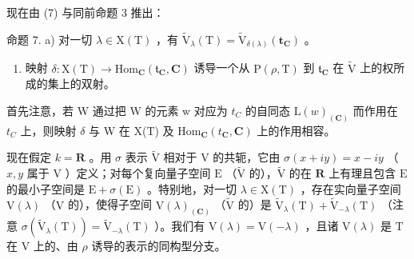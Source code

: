 现在由 (7) 与同前命题 3 推出：

命题 7. a) 对一切 \(\lambda \in \mathrm{X(T)}\) ，有 \(\tilde{\mathrm{V}}_{\lambda}(\mathrm{T}) = \tilde{\mathrm{V}}_{\delta (\lambda)}(\mathbf{t}_{\mathbf{C}})\) 。

\begin{enumerate}
\def\labelenumi{\alph{enumi})}
\setcounter{enumi}{1}
\tightlist
\item
  映射 \(\delta : \mathrm{X(T)} \to \mathrm{Hom}_{\mathbf{C}}(\mathfrak{t}_{\mathbf{C}}, \mathbf{C})\) 诱导一个从 \(\mathrm{P}(\rho, \mathrm{T})\) 到 \(\mathfrak{t}_{\mathbf{C}}\) 在 \(\tilde{\mathrm{V}}\) 上的权所成的集上的双射。
\end{enumerate}

首先注意，若 W 通过把 W 的元素 w 对应为 \(t_{C}\) 的自同态 \(\mathrm{L}(w)_{(\mathbf{C})}\) 而作用在 \(t_{C}\) 上，则映射 \(\delta\) 与 W 在 X(T) 及 \(\mathrm{Hom}_{\mathbf{C}}(t_{\mathbf{C}}, \mathbf{C})\) 上的作用相容。

现在假定 \(k = \mathbf{R}\) 。用 \(\sigma\) 表示 \(\tilde{\mathrm{V}}\) 相对于 \(\mathrm{V}\) 的共轭，它由 \(\sigma(x + iy) = x - iy\) （\(x, y\) 属于 \(\mathrm{V}\) ）定义；对每个复向量子空间 \(\mathrm{E}\) （\(\tilde{\mathrm{V}}\) 的），\(\tilde{\mathrm{V}}\) 的在 \(\mathbf{R}\) 上有理且包含 \(\mathrm{E}\) 的最小子空间是 \(\mathrm{E} + \sigma(\mathrm{E})\) 。特别地，对一切 \(\lambda \in \mathrm{X}(\mathrm{T})\) ，存在实向量子空间 \(\mathrm{V}(\lambda)\) （\(\mathrm{V}\) 的），使得子空间 \(\mathrm{V}(\lambda)_{(\mathbf{C})}\) （\(\tilde{\mathrm{V}}\) 的）是 \(\tilde{\mathrm{V}}_{\lambda}(\mathrm{T}) + \tilde{\mathrm{V}}_{-\lambda}(\mathrm{T})\) （注意 \(\sigma(\tilde{\mathrm{V}}_{\lambda}(\mathrm{T})) = \tilde{\mathrm{V}}_{-\lambda}(\mathrm{T})\) ）。我们有 \(\mathrm{V}(\lambda) = \mathrm{V}(-\lambda)\) ，且诸 \(\mathrm{V}(\lambda)\) 是 \(\mathrm{T}\) 在 \(\mathrm{V}\) 上的、由 \(\rho\) 诱导的表示的同构型分支。

